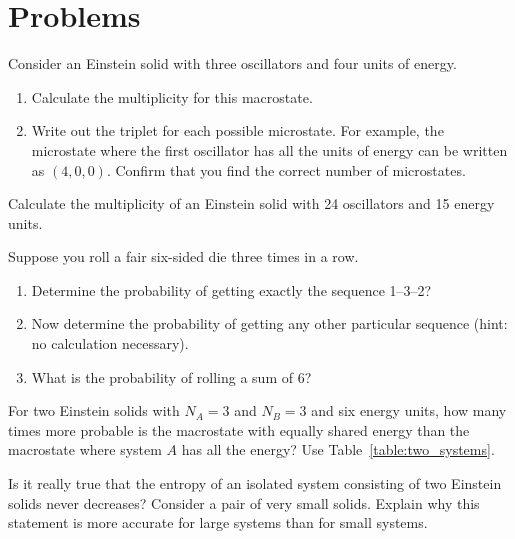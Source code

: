 \section*{Problems}

\begin{exercise}
Consider an Einstein solid with three oscillators and four units of
energy.
\begin{enumerate}
\item Calculate the multiplicity for this macrostate.
\item Write out the triplet for each possible microstate.  For
  example, the microstate where the first oscillator has all the units
  of energy can be written as $(4,0,0)$.  Confirm that you find the
  correct number of microstates.
\end{enumerate}
\label{prob:multiplicityforthree}
\end{exercise}

\begin{exercise}
Calculate the multiplicity of an Einstein solid with 24 oscillators
and 15 energy units.  
\label{prob:mult_of_twentyfour}
\end{exercise}

\begin{exercise}
Suppose you roll a fair six-sided die three times in a row.
\begin{enumerate}
\item Determine the probability of getting exactly the sequence 1--3--2?
\item Now determine the probability of getting any other particular
sequence (hint: no calculation necessary).
\item What is the probability of rolling a sum of 6?
\end{enumerate}
\label{prob:rolldie}
\end{exercise}

\begin{exercise}
  For two Einstein solids with $N_A=3$ and $N_B=3$ and six energy
  units, how many times more probable is the macrostate with equally
  shared energy than the macrostate where system $A$ has all the
  energy?  Use Table~\ref{table:two_systems}.
\label{prob:twosolids}
\end{exercise}

\begin{exercise}
Is it really true that the entropy of an isolated system consisting of
two Einstein solids never decreases?  Consider a pair of very small
solids.  Explain why this statement is more accurate for large systems
than for small systems.
\end{exercise}

